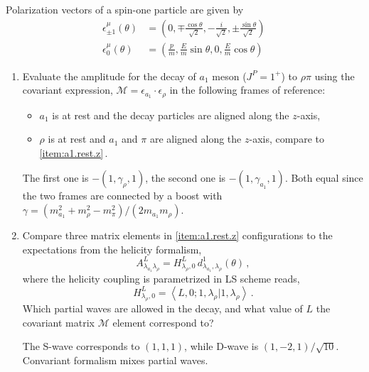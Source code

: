 
Polarization vectors of a spin-one particle are given by
\begin{align}
    \epsilon^\mu_{\pm 1}(\theta) & = \left(0,\mp \frac{\cos \theta}{\sqrt{2}}, -\frac{i}{\sqrt{2}}, \pm \frac{\sin \theta}{\sqrt{2}}\right)\, \\
    \epsilon^\mu_{0}(\theta)     & = \left(\frac{p}{m}, \frac{E}{m}\sin\theta, 0, \frac{E}{m}\cos\theta \right)
\end{align}

\begin{enumerate}
    \item
          Evaluate the amplitude for the decay of $a_1$ meson ($J^P=1^+$) to $\rho\pi$
          using the covariant expression, $\mathcal{M} = \epsilon_{a_1} \cdot \epsilon_\rho$
          in the following frames of reference:
          \begin{itemize}
              \item \label{item:a1.rest.z} $a_1$ is at rest and the decay particles are aligned along the $z$-axis,
              \item $\rho$ is at rest and $a_1$ and $\pi$ are aligned along the $z$-axis, compare to \eqref{item:a1.rest.z}\,.
          \end{itemize}

          \begin{solution}
              The first one is $-(1,\gamma_{\rho},1)$, the second one is $-(1,\gamma_{a_1},1)$. Both equal since the two frames are connected by a boost with $\gamma = (m_{a_1}^2+m_\rho^2-m_{\pi}^2 ) / (2m_{a_1}m_{\rho})$.
          \end{solution}
    \item
          Compare three matrix elements in \eqref{item:a1.rest.z} configurations to the expectations from the helicity formalism,
          \begin{equation}
              A_{\lambda_{a_1}\lambda_{\rho}}^L = H_{\lambda_\rho,0}^L\,d_{\lambda_{a_1},\lambda_{\rho}}^1(\theta)\,,
          \end{equation}
          where the helicity coupling is parametrized in LS scheme reads,
          \begin{equation}
              H_{\lambda_\rho,0}^L = \left\langle L,0;1,\lambda_\rho|1,\lambda_\rho\right\rangle\,.
          \end{equation}
          Which partial waves are allowed in the decay, and what value of $L$ the covariant matrix $\mathcal{M}$ element correspond to?

          \begin{solution}
              The S-wave corresponds to $(1,1,1)$, while D-wave is $(1,-2,1)/\sqrt{10}$. Convariant formalism mixes partial waves.
          \end{solution}
\end{enumerate}


